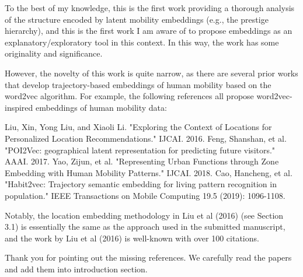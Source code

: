 \documentclass[12pt,a4paper]{article}
\newcommand{\response}[1]{{\leavevmode\noindent #1}}
\newcommand{\rcomment}[1]{%
\vspace{10pt}
\begin{tcolorbox}[colback=black!3,colframe=white!45!black]
#1
\end{tcolorbox}
}
\begin{document}
\rcomment{%
To the best of my knowledge, this is the first work providing a thorough analysis of the structure encoded by latent mobility embeddings (e.g., the prestige hierarchy), and this is the first work I am aware of to propose embeddings as an explanatory/exploratory tool in this context. In this way, the work has some originality and significance.

However, the novelty of this work is quite narrow, as there are several prior works that develop trajectory-based embeddings of human mobility based on the word2vec algorithm. For example, the following references all propose word2vec-inspired embeddings of human mobility data:

Liu, Xin, Yong Liu, and Xiaoli Li. "Exploring the Context of Locations for Personalized Location Recommendations." IJCAI. 2016.
Feng, Shanshan, et al. "POI2Vec: geographical latent representation for predicting future visitors." AAAI. 2017.
Yao, Zijun, et al. "Representing Urban Functions through Zone Embedding with Human Mobility Patterns." IJCAI. 2018.
Cao, Hancheng, et al. "Habit2vec: Trajectory semantic embedding for living pattern recognition in population." IEEE Transactions on Mobile Computing 19.5 (2019): 1096-1108.

Notably, the location embedding methodology in Liu et al (2016) (see Section 3.1) is essentially the same as the approach used in the submitted manuscript, and the work by Liu et al (2016) is well-known with over 100 citations.
}

\response{%
Thank you for pointing out the missing references. We carefully read the papers and add them into introduction section.
}
\end{document}

